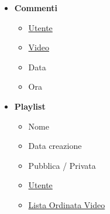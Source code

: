 \begin{minipage}[t]{0.5\textwidth}
	\begin{itemize}
		\item \textbf{Commenti}
		\begin{itemize}
			\item \underline{Utente}
			\item \underline{Video}
			\item Data
			\item Ora
		\end{itemize}
		\item \textbf{Playlist}
		\begin{itemize}
			\item Nome
			\item Data creazione
			\item Pubblica / Privata
			\item \underline{Utente}
			\item \underline{Lista Ordinata Video}
		\end{itemize}
	\end{itemize}
\end{minipage}